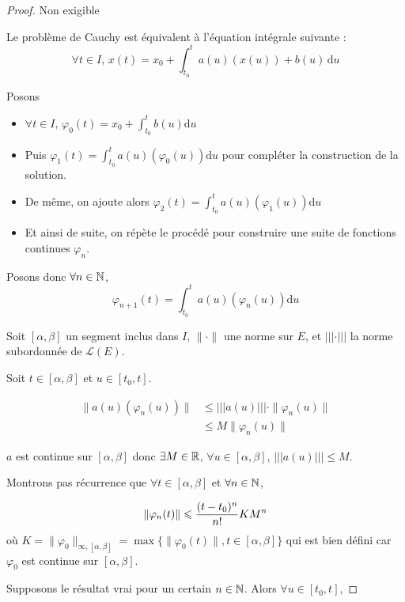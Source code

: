 \begin{proof} Non exigible 


    Le problème de Cauchy est équivalent à l'équation intégrale suivante :
    $$\forall t \in I, \, x(t) = x_0 + \int_{t_0}^{t} a(u)(x(u)) + b(u) \, \mathrm d u$$

    Posons
    \begin{itemize}
        \item $\forall t \in I, \, \varphi_0(t) = x_0 + \int_{t_0}^{t} b(u) \mathrm d u$
        \item Puis $\varphi_1(t) = \int_{t_0}^{t} a(u)(\varphi_0(u)) \mathrm d u$ pour compléter la construction de la solution.
        \item De même, on ajoute alors $\varphi_2(t) = \int_{t_0}^{t} a(u)(\varphi_1(u)) \mathrm d u$
        \item Et ainsi de suite, on répète le procédé pour construire une suite de fonctions continues $\varphi_n$.
    \end{itemize} 
    Posons donc $\forall n \in \mathbb{N}$, $$\varphi_{n + 1}(t) = \int_{t_0}^{t} a(u)(\varphi_n(u)) \mathrm d u$$

    Soit $[\alpha, \beta]$ un segment inclus dans $I$, $\| \cdot \|$ une norme sur $E$, et 
    $||| \cdot |||$ la norme subordonnée de $\mathscr L(E)$.

    Soit $t \in [\alpha, \beta]$ et $u \in [t_0, t]$. 

    \begin{align}
        \| a(u)(\varphi_n(u)) \| & \leqslant ||| a(u) ||| \cdot \| \varphi_n(u) \| \\
        & \leqslant M \| \varphi_n(u) \|
    \end{align}

    $a$ est continue sur $[\alpha, \beta]$ donc $\exists M \in \mathbb{R}$, $\forall u \in [\alpha, \beta]$, 
    $||| a(u) ||| \leqslant M$.

    Montrons pas récurrence que $\forall t \in [\alpha, \beta]$ et $\forall n \in \mathbb{N}$, 

    $$\displaystyle \| \varphi_n(t) \| \leqslant \frac{(t - t_0)^n}{n!} K M^n$$
    où $K = \| \varphi_0 \|_{\infty, [\alpha, \beta]} = \max \{ \| \varphi_0(t) \|, t \in [\alpha, \beta] \}$ qui
    est bien défini car $\varphi_0$ est continue sur $[\alpha, \beta]$.

    Supposons le résultat vrai pour un certain $n \in \mathbb{N}$. Alors 
    $\forall u \in [t_0, t]$, 


\end{proof}
